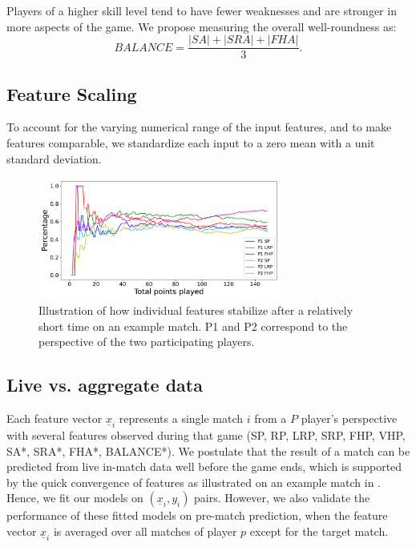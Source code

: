 Players of a higher skill level tend to have fewer weaknesses and are stronger in more aspects of the game. We propose measuring the overall well-roundness as:
\begin{equation}
    \textit{BALANCE} = \frac{|\textit{SA}|+|\textit{SRA}|+|\textit{FHA}|}{3}.
\end{equation}


\subsection{Feature Scaling}
To account for the varying numerical range of the input features, and to make features comparable, we standardize each input to a zero mean with a unit standard deviation.

\begin{figure}[b]
\centering
\includegraphics[width=8cm]{plots/chiang4.pdf}
\caption{Illustration of how individual features stabilize after a relatively short time on an example match. P1 and P2 correspond to the perspective of the two participating players.}
\label{fig:time}
\end{figure}

\subsection{Live vs. aggregate data}

Each feature vector $\underline{x}_i$ represents a single match $i$ from a $P$ player's perspective with several features observed during that game (SP, RP, LRP, SRP, FHP, VHP, SA*, SRA*, FHA*, BALANCE*). We postulate that the result of a match can be predicted from live in-match data well before the game ends, which is supported by the quick convergence of features as illustrated on an example match in . Hence, we fit our models on $(\underline{x}_i,y_i)$ pairs. However, we also validate the performance of these fitted models on pre-match prediction, when the feature vector $\underline{x}_i$ is averaged over all matches of player $p$ except for the target match.


